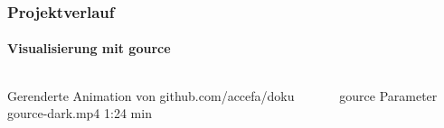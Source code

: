 \begin{frame}
	\frametitle{Projektverlauf\hfill{}\footnotesize \group}
	\framesubtitle{Visualisierung mit gource}
	\begin{columns}
		\begin{column}{0.5\textwidth}
			\begin{block}{Gerenderte Animation von github.com/accefa/doku}
				\\ gource-dark.mp4 \hfill{} 1:24 min
			\end{block}
		\end{column}
		\begin{column}{0.5\textwidth}
			\begin{exampleblock}{gource Parameter}
				
			\end{exampleblock}
		\end{column}
	\end{columns}
\end{frame}


